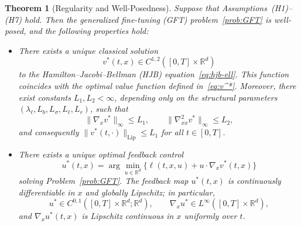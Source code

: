 \documentclass[11pt]{article}
\newtheorem{theorem}{Theorem}[section]
\begin{document}
\begin{theorem}[Regularity and Well-Posedness]
\label{theo:Regularity}
Suppose that Assumptions~\textnormal{(H1)--(H7)} hold.  
Then the generalized fine-tuning (GFT) problem~\ref{prob:GFT} is well-posed, and the following properties hold:

\begin{itemize}
\item[\textbf{(i)}]  
There exists a unique classical solution 
\[
v^*(t,x) \in C^{1,2}([0,T]\times\mathbb{R}^d)
\]
to the Hamilton--Jacobi--Bellman (HJB) equation~\eqref{eq:hjb-ell}.  
This function coincides with the optimal value function defined in~\eqref{eq:v^*}.  
Moreover, there exist constants $L_1,L_2<\infty$, depending only on the structural parameters $(\lambda_\ell,L_b,L_\sigma,L_\ell,L_r)$, such that
\[
\|\nabla_x v^*\|_\infty \le L_1, 
\qquad 
\|\nabla_{xx}^2 v^*\|_\infty \le L_2,
\]
and consequently $\|v^*(t,\cdot)\|_{\mathrm{Lip}}\le L_1$ for all $t\in[0,T]$.

\item[\textbf{(ii)}] 
There exists a unique optimal feedback control 
\[
u^*(t,x) = \arg\min_{u\in\mathbb{R}^d}\{\ell(t,x,u)+u\cdot\nabla_x v^*(t,x)\}
\]
solving Problem~\ref{prob:GFT}.  
The feedback map $u^*(t,x)$ is continuously differentiable in $x$ and globally Lipschitz; in particular,
\[
u^* \in C^{0,1}([0,T]\times\mathbb{R}^d;\mathbb{R}^d),
\qquad 
\nabla_x u^* \in L^\infty([0,T]\times\mathbb{R}^d),
\]
and $\nabla_x u^*(t,x)$ is Lipschitz continuous in $x$ uniformly over $t$.
\end{itemize}
\end{theorem}
\end{document}
